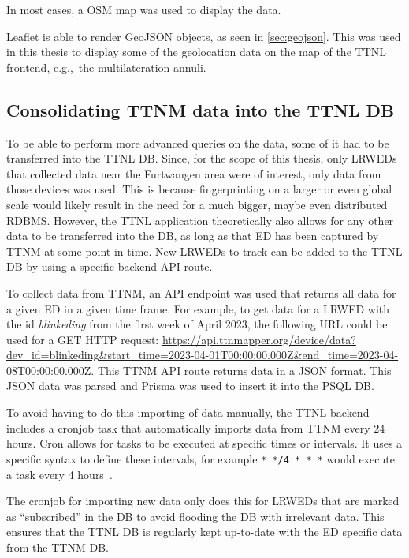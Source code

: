 In most cases, a \ac{OSM} map was used to display the data.

Leaflet is able to render GeoJSON objects, as seen in \cref{sec:geojson}.
This was used in this thesis to display some of the geolocation data on the map of the \ac{TTNL} frontend, e.g.,\ the multilateration annuli.

\subsection{Consolidating \acl{TTNM} data into the \acl{TTNL} \acl{DB}}\label{sec:consolidating-ttnm-data-into-ttnl-db}

To be able to perform more advanced queries on the data, some of it had to be transferred into the \ac{TTNL} \acl{DB}.
Since, for the scope of this thesis, only \aclp{LRWED} that collected data near the Furtwangen area were of interest, only data from those devices was used.
This is because fingerprinting on a larger or even global scale would likely result in the need for a much bigger, maybe even distributed \ac{RDBMS}.
However, the \ac{TTNL} application theoretically also allows for any other data to be transferred into the \ac{DB}, as long as that \acl{ED} has been captured by \ac{TTNM} at some point in time.
New \aclp{LRWED} to track can be added to the \ac{TTNL} \ac{DB} by using a specific backend \ac{API} route.

To collect data from \ac{TTNM}, an \ac{API} endpoint was used that returns all data for a given \acl{ED} in a given time frame.
For example, to get data for a \acl{LRWED} with the id \emph{blinkeding} from the first week of April 2023, the following \ac{URL} could be used for a GET \ac{HTTP} request: \url{https://api.ttnmapper.org/device/data?dev_id=blinkeding&start_time=2023-04-01T00:00:00.000Z&end_time=2023-04-08T00:00:00.000Z}.
This \ac{TTNM} \ac{API} route returns data in a \ac{JSON} format.
This \ac{JSON} data was parsed and Prisma was used to insert it into the \ac{PSQL} \ac{DB}.

To avoid having to do this importing of data manually, the \ac{TTNL} backend includes a cronjob task that automatically imports data from \ac{TTNM} every 24 hours.
Cron allows for tasks to be executed at specific times or intervals.
It uses a specific syntax to define these intervals, for example \texttt{* */4 * * *} would execute a task every 4 hours~\cite{drake_how_2020}.

The cronjob for importing new data only does this for \aclp{LRWED} that are marked as ``subscribed'' in the \ac{DB} to avoid flooding the \ac{DB} with irrelevant data.
This ensures that the \ac{TTNL} \ac{DB} is regularly kept up-to-date with the \acl{ED} specific data from the \ac{TTNM} \ac{DB}.

